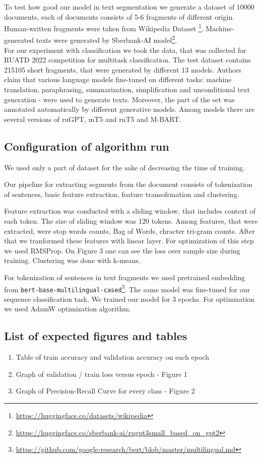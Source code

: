\documentclass{article}
\begin{document}
To test how good our model in text segmentation we generate a dataset of 10000 documents, each of documents consists of 5-6 fragments of different origin. Human-written fragments were taken from Wikipedia Dataset \footnote{\url{https://huggingface.co/datasets/wikipedia}}. Machine-generated texts were generated by Sberbank-AI model\footnote{\url{https://huggingface.co/sberbank-ai/rugpt3small_based_on_gpt2}}. \\
For our experiment with classification we took the data, that was collected for RUATD 2022 competition\cite{ruatd-dataset} for multitask classification. The test dataset contains 215105 short fragments, that were generated by different 13 models. Authors claim that various language models fine-tuned on different tasks: machine translation, paraphrasing, summarization, simplification and unconditional text generation - were used to generate texts. Moreover, the part of the set was annotated automatically by different generative models. Among models there are several versions of ruGPT, mT5 and ruT5 and M-BART.

\subsection{Configuration of algorithm run}

We used only a part of dataset for the sake of decreasing the time of training. 

Our pipeline for extracting segments from the document consists of tokenization of sentences, basic feature extraction, feature transofrmation and clustering. 

Feature extraction was conducted with a sliding window, that includes context of each token. The size of sliding window was 120 tokens. Among features, that were extracted, were stop words counts, Bag of Words, chracter tri-gram counts. After that we tranformed these features with linear layer. For optimization of this step we used RMSProp. On Figure 3 one can see the loss over sample size during training. Clustering was done with k-means.


For tokenization of sentences in text fragments we used pretrained embedding from \texttt{bert-base-multilingual-cased}\footnote{\url{https://github.com/google-research/bert/blob/master/multilingual.md}}. The same model was fine-tuned for our sequence classification task. We trained our model for 3 epochs. For optimization we used AdamW optimization algorithm\cite{adam-w}.


\subsection{List of expected figures and tables}
\begin{enumerate}
    \item Table of train accuracy and validation accuracy on each epoch
    \item Graph of validation / train loss versus epoch - Figure 1
    \item Graph of Precision-Recall Curve for every class - Figure 2
\end{enumerate}
\end{document}
